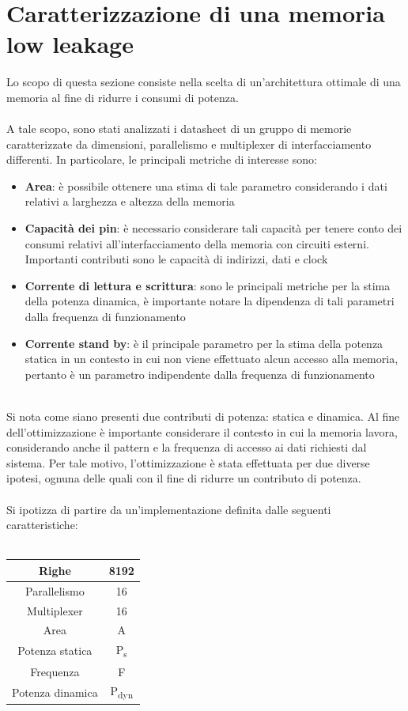 \documentclass[11pt,  english, makeidx, a4paper, titlepage, oneside]{book}
\begin{document}
\section{Caratterizzazione di una memoria low leakage}
Lo scopo di questa sezione consiste nella scelta di un'architettura ottimale di una memoria al fine di ridurre i consumi di potenza.
\\\\
A tale scopo, sono stati analizzati i datasheet di un gruppo di memorie caratterizzate da dimensioni, parallelismo e multiplexer di interfacciamento differenti. In particolare, le principali metriche di interesse sono:
\begin{itemize}
\item \textbf{Area}: è possibile ottenere una stima di tale parametro considerando i dati relativi a larghezza e altezza della memoria\\
\item \textbf{Capacità dei pin}: è necessario considerare tali capacità per tenere conto dei consumi relativi all'interfacciamento della memoria con circuiti esterni. Importanti contributi sono le capacità di indirizzi, dati e clock\\
\item \textbf{Corrente di lettura e scrittura}: sono le principali metriche per la stima della potenza dinamica, è importante notare la dipendenza di tali parametri dalla frequenza di funzionamento\\
\item \textbf{Corrente stand by}: è il principale parametro per la stima della potenza statica in un contesto in cui non viene effettuato alcun accesso alla memoria, pertanto è un parametro indipendente dalla frequenza di funzionamento\\\\
\end{itemize}
Si nota come siano presenti due contributi di potenza: statica e dinamica. Al fine dell'ottimizzazione è importante considerare il contesto in cui la memoria lavora, considerando anche il pattern e la frequenza di accesso ai dati richiesti dal sistema. Per tale motivo, l'ottimizzazione è stata effettuata per due diverse ipotesi, ognuna delle quali con il fine di ridurre un contributo di potenza.
\\\\
Si ipotizza di partire da un'implementazione definita dalle seguenti caratteristiche:
\\\\
\begin{center}
	\begin{tabular}{|c|c|}
	\hline
	Righe & 8192\\
	\hline
	Parallelismo & 16\\
	\hline
	Multiplexer & 16\\
	\hline
	Area & A\\
	\hline
	Potenza statica & P\textsubscript{s}\\
	\hline
	Frequenza & F\\
	\hline
	Potenza dinamica & P\textsubscript{dyn}\\
	\hline
	\end{tabular}	
\end{center}
\vspace{0.3cm}
\end{document}
